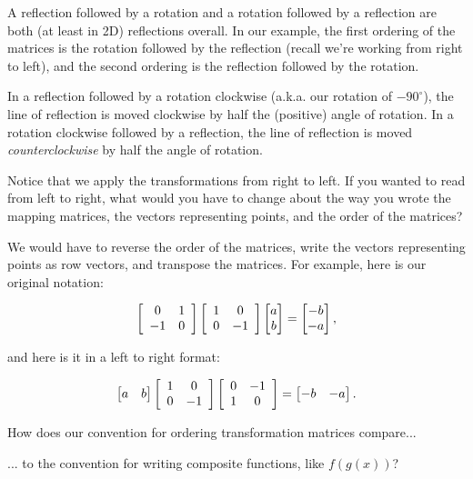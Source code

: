 \documentclass[../key.tex]{subfiles}
\begin{document}
A reflection followed by a rotation and a rotation followed by a reflection are both (at least in 2D) reflections overall. In our example, the first ordering of the matrices is the rotation followed by the reflection (recall we're working from right to left), and the second ordering is the reflection followed by the rotation.

In a reflection followed by a rotation clockwise (a.k.a. our rotation of $-90^\circ$), the line of reflection is moved clockwise by half the (positive) angle of rotation. In a rotation clockwise followed by a reflection, the line of reflection is moved \textit{counterclockwise} by half the angle of rotation.

\begin{inner_problem}
\item Notice that we apply the transformations from right to left. If you wanted to read from left to right, what would you have to change about the way you wrote the mapping matrices, the vectors representing points, and the order of the matrices?
\end{inner_problem}

We would have to reverse the order of the matrices, write the vectors representing points as row vectors, and transpose the matrices. For example, here is our original notation:

$$\left[\begin{array}{cc} 0 & 1 \\ -1 & 0 \end{array}\right]\left[\begin{array}{cc} 1 & 0 \\ 0 & -1 \end{array}\right]\begin{bmatrix} a \\ b \end{bmatrix} = \begin{bmatrix}-b \\ -a \end{bmatrix},$$

and here is it in a left to right format:

$$\begin{bmatrix} a & b \end{bmatrix} \left[\begin{array}{cc} 1 & 0 \\ 0 & -1 \end{array}\right]\left[\begin{array}{cc} 0 & -1 \\ 1 & 0 \end{array}\right] = \begin{bmatrix} -b & -a \end{bmatrix}.$$

\begin{inner_problem}
\item How does our convention for ordering transformation matrices compare...
\end{inner_problem}

\begin{iinner_problem}[start=1]
\item ... to the convention for writing composite functions, like $f(g(x))$?
\end{iinner_problem}
\end{document}
